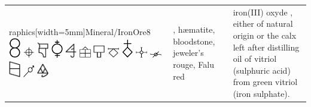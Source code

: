 \documentclass[british,final,landscape]{scrartcl}
\begin{document}
\begin{refsection}
\begin{supertabular}{p{0.3\textwidth}p{0.34\textwidth}p{0.34\textwidth}}
raphics[width=5mm]{Mineral/IronOre8} \includegraphics[width=5mm]{Mineral/IronOre9} \includegraphics[width=5mm]{Mineral/IronOre10} \includegraphics[width=5mm]{Mineral/IronOre11} \includegraphics[width=5mm]{Mineral/IronOre12} \includegraphics[width=5mm]{Mineral/IronOre13} \includegraphics[width=5mm]{Mineral/IronOre14} \includegraphics[width=5mm]{Mineral/IronOre15} \includegraphics[width=5mm]{Mineral/IronOre16} \includegraphics[width=5mm]{Mineral/IronOre17} \includegraphics[width=5mm]{Mineral/IronOre18} \includegraphics[width=5mm]{Mineral/IronOre19} \includegraphics[width=5mm]{Mineral/IronOre20} \includegraphics[width=5mm]{Mineral/IronOre21} \includegraphics[width=5mm]{Mineral/IronOre22} & , hæmatite, bloodstone, jeweler's rouge, Falu red & iron(III) oxyde , either of natural origin or the calx left after distilling oil of vitriol (sulphuric acid) from green vitriol (iron sulphate). \\

\end{supertabular}
\end{refsection}
\end{document}
